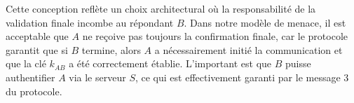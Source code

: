 Cette conception reflète un choix architectural où la responsabilité de la validation finale
incombe au répondant $B$. Dans notre modèle de menace, il est acceptable que $A$ ne reçoive pas
toujours la confirmation finale, car le protocole garantit que si $B$ termine, alors $A$ a
nécessairement initié la communication et que la clé $k_{AB}$ a été correctement établie.
L'important est que $B$ puisse authentifier $A$ via le serveur $S$, ce qui est effectivement
garanti par le message 3 du protocole.